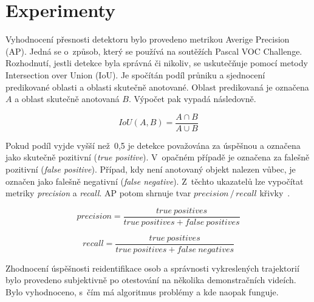 
\chapter{Experimenty}
\label{chap_6}

Vyhodnocení přesnosti detektoru bylo provedeno metrikou Averige Precision (AP). Jedná se o~způsob, který se používá na soutěžích Pascal VOC Challenge. Rozhodnutí, jestli detekce byla správná či nikoliv, se uskutečňuje pomocí metody Intersection over Union (IoU). Je spočítán podíl průniku a sjednocení predikované oblasti a oblasti skutečně anotované. Oblast predikovaná je označena $A$ a oblast skutečně anotovaná $B$. Výpočet pak vypadá následovně.

\begin{equation}
    IoU(A, B) = \frac{A \cap B}{A \cup  B}
\end{equation}

Pokud podíl vyjde vyšší než~0,5 je detekce považována za úspěšnou a označena jako skutečně pozitivní (\textit{true positive}). V~opačném případě je označena za falešně pozitivní (\textit{false positive}). Případ, kdy není anotovaný objekt nalezen vůbec, je označen jako falešně negativní (\textit{false negative}). Z~těchto ukazatelů lze vypočítat metriky \textit{precision} a \textit{recall}. AP potom shrnuje tvar $precision\,/\,recall$ křivky~\cite{paperAP}.

\begin{equation}
    precision = \frac{true \: positives}{true \: positives + false \: positives}
\end{equation}

\begin{equation}
    recall = \frac{true \: positives}{true \: positives + false \: negatives}
\end{equation}

Zhodnocení úspěšnosti reidentifikace osob a správnosti vykreslených trajektorií bylo provedeno subjektivně po otestování na několika demonstračních videích. Bylo vyhodnoceno, s~čím má algoritmus problémy a kde naopak funguje.


